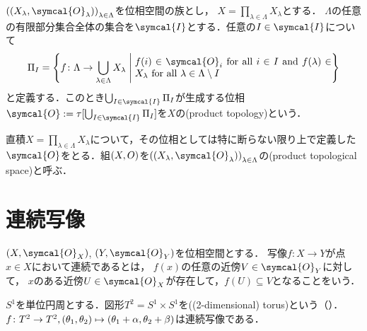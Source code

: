 \documentclass{ltjsbook}
\begin{document}
\begin{thmbox}
\begin{definition}
\({\tuple{\tuple{X_\lambda, \symcal{O}_\lambda}}}_{\lambda \in \Lambda}\)を位相空間の族とし，
\(X = \prod_{\lambda \in \Lambda} X_\lambda\)とする．
\(\Lambda\)の任意の有限部分集合全体の集合を\(\symcal{I}\)とする．任意の\(I \in \symcal{I}\)について
\begin{align*}
    \Pi_I = \left\{ f\colon \Lambda \to \bigcup_{\lambda \in \Lambda} X_\lambda \relmiddle{|} \text{\parbox{7cm}{\(f(i) \in \symcal{O}_i\) for all \(i \in I\) and \(f(\lambda) \in X_\lambda\) for all \(\lambda \in \Lambda \setminus I\)}}\right\}
\end{align*}
と定義する．このとき\(\bigcup_{I \in \symcal{I}} \Pi_I\)が生成する位相\(\symcal{O}:=\tau[\bigcup_{I \in \symcal{I}}\Pi_I]\)を\(X\)の(product topology)という．
\end{definition}
\end{thmbox}

直積\(X = \prod_{\lambda \in \Lambda} X_\lambda\)について，その位相としては特に断らない限り上で定義した\(\symcal{O}\)をとる．組\((X, O)\)を\({\tuple{\tuple{X_\lambda, \symcal{O}_\lambda}}}_{\lambda \in \Lambda}\)の(product topological space)と呼ぶ．

\section{連続写像}
\begin{thmbox}
\begin{definition}
\(\tuple{X, \symcal{O}_{X}}\), \(\tuple{Y, \symcal{O}_{Y}}\)を位相空間とする．
写像\(f\colon X \to Y\)が点\(x \in X\)において連続であるとは，
\(f(x)\)の任意の近傍\(V \in \symcal{O}_Y\)に対して，
\(x\)のある近傍\(U \in \symcal{O}_X\)が存在して，\(f(U) \subseteq V\)となることをいう．
\end{definition}
\end{thmbox}

\begin{exa} \(S^1\)を単位円周とする．図形\(T^2 = S^1 \times S^1\)を((2-dimensional) torus)という（）．
\(f \colon T^2 \to T^2, (\theta_1, \theta_2) \mapsto (\theta_1 + \alpha, \theta_2 + \beta)\)は連続写像である．
\end{exa}
\end{document}
